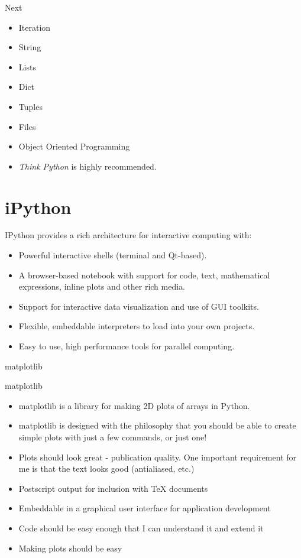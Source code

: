 \documentclass[UTF8]{beamer}
\begin{document}
\begin{frame}[t]{Next}
  \begin{itemize}
    \item Iteration
    \item String
    \item Lists
    \item Dict
    \item Tuples
    \item Files
    \item Object Oriented Programming
    \item \textit{Think Python} is highly recommended.
  \end{itemize}
\end{frame}

\section{iPython}
\begin{frame}[t]
  IPython provides a rich architecture for interactive computing with:
\begin{itemize}
\item Powerful interactive shells (terminal and Qt-based).
\item A browser-based notebook with support for code, text, mathematical expressions, inline plots and other rich media.
\item Support for interactive data visualization and use of GUI toolkits.
\item Flexible, embeddable interpreters to load into your own projects.
\item Easy to use, high performance tools for parallel computing.
\end{itemize}
\end{frame}

\begin{frame}[t]{matplotlib}
  \begin{block}{matplotlib}
    \begin{itemize}
      \item matplotlib is a library for making 2D plots of arrays in Python.
      \item matplotlib is designed with the philosophy that you should be able
      to create simple plots with just a few commands, or just one!
      \item Plots should look great - publication quality. One important
      requirement for me is that the text looks good (antialiased, etc.)
      \item Postscript output for inclusion with TeX documents
      \item Embeddable in a graphical user interface for application development
      \item Code should be easy enough that I can understand it and extend it
      \item Making plots should be easy
    \end{itemize}
  \end{block}
\end{frame}
\end{document}
